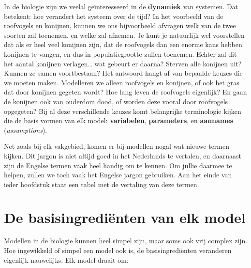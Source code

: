 \documentclass[
  a4paper,
]{scrbook}
\theoremstyle{definition}
\theoremstyle{remark}
\begin{document}
In de biologie zijn we veelal geïnteresseerd in de \textbf{dynamiek} van
systemen. Dat betekent: hoe verandert het systeem over de tijd? In het
voorbeeld van de roofvogels en konijnen, kunnen we ons bijvoorbeeld
afvragen welk van de twee soorten zal toenemen, en welke zal afnemen. Je
kunt je natuurlijk wel voorstellen dat als er heel veel konijnen zijn,
dat de roofvogels dan een enorme kans hebben konijnen te vangen, en dus
in populatiegrootte zullen toenemen. Echter zal dit het aantal konijnen
verlagen\ldots{} wat gebeurt er daarna? Sterven alle konijnen uit?
Kunnen ze samen voortbestaan? Het antwoord hangt af van bepaalde keuzes
die we moeten maken. Modelleren we alleen roofvogels en konijnen, of ook
het gras dat door konijnen gegeten wordt? Hoe lang leven de roofvogels
eigenlijk? En gaan de konijnen ook van ouderdom dood, of worden deze
vooral door roofvogels opgegeten? Bij al deze verschillende keuzes komt
belangrijke terminologie kijken die de basis vormen van elk model:
\textbf{variabelen}, \textbf{parameters}, en \textbf{aannames}
(\emph{assumptions}).

\begin{tcolorbox}[enhanced jigsaw, rightrule=.15mm, opacityback=0, leftrule=.75mm, title=\textcolor{quarto-callout-note-color}{\faInfo}\hspace{0.5em}{Nederlands (\emph{Dutch})}, toptitle=1mm, titlerule=0mm, opacitybacktitle=0.6, colframe=quarto-callout-note-color-frame, breakable, colbacktitle=quarto-callout-note-color!10!white, coltitle=black, toprule=.15mm, bottomrule=.15mm, left=2mm, bottomtitle=1mm, arc=.35mm, colback=white]

Net zoals bij elk vakgebied, komen er bij modellen nogal wat nieuwe
termen kijken. Dit jargon is niet altijd goed in het Nederlands te
vertalen, en daarnaast zijn de Engelse termen vaak heel handig om te
kennen. Om jullie daarmee te helpen, zullen we toch vaak het Engelse
jargon gebruiken. Aan het einde van ieder hoofdstuk staat een tabel met
de vertaling van deze termen.

\end{tcolorbox}

\section{De basisingrediënten van elk
model}\label{de-basisingrediuxebnten-van-elk-model}

Modellen in de biologie kunnen heel simpel zijn, maar soms ook vrij
complex zijn. Hoe ingewikkeld of simpel een model ook is, de
basisingrediënten veranderen eigenlijk nauwelijks. Elk model draait om:
\end{document}
